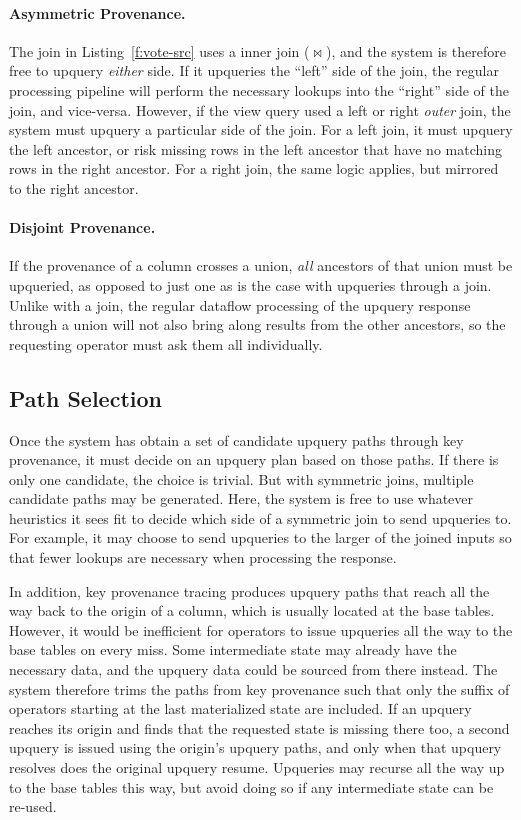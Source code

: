 \paragraph{Asymmetric Provenance.}
The join in Listing~\ref{f:vote-src} uses a inner join ($\bowtie$), and the
system is therefore free to upquery \emph{either} side. If it upqueries the
``left'' side of the join, the regular processing pipeline will perform the
necessary lookups into the ``right'' side of the join, and vice-versa. However,
if the view query used a left or right \emph{outer} join, the system must
upquery a particular side of the join. For a left join, it must upquery the left
ancestor, or risk missing rows in the left ancestor that have no matching rows
in the right ancestor. For a right join, the same logic applies, but mirrored to
the right ancestor.

\paragraph{Disjoint Provenance.}
If the provenance of a column crosses a union, \emph{all} ancestors of that
union must be upqueried, as opposed to just one as is the case with upqueries
through a join. Unlike with a join, the regular dataflow processing of the
upquery response through a union will not also bring along results from the
other ancestors, so the requesting operator must ask them all individually.

\subsection{Path Selection}

Once the system has obtain a set of candidate upquery paths through key
provenance, it must decide on an upquery plan based on those paths. If there is
only one candidate, the choice is trivial. But with symmetric joins, multiple
candidate paths may be generated. Here, the system is free to use whatever
heuristics it sees fit to decide which side of a symmetric join to send
upqueries to. For example, it may choose to send upqueries to the larger of the
joined inputs so that fewer lookups are necessary when processing the response.

In addition, key provenance tracing produces upquery paths that reach all the
way back to the origin of a column, which is usually located at the base tables.
However, it would be inefficient for operators to issue upqueries all the way to
the base tables on every miss. Some intermediate state may already have the
necessary data, and the upquery data could be sourced from there instead. The
system therefore trims the paths from key provenance such that only the suffix
of operators starting at the last materialized state are included. If an upquery
reaches its origin and finds that the requested state is missing there too, a
second upquery is issued using the origin's upquery paths, and only when that
upquery resolves does the original upquery resume. Upqueries may recurse all the
way up to the base tables this way, but avoid doing so if any intermediate state
can be re-used.

